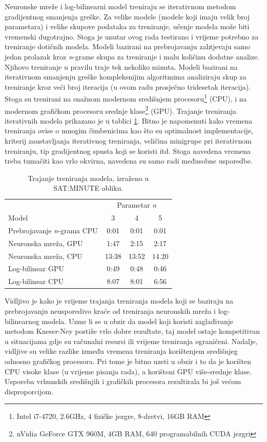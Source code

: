 \documentclass[times, utf8, diplomski, numeric]{fer}
\begin{document}
Neuronske mreže i log-bilinearni model treniraju se iterativnom metodom gradijentnog smanjenja greške. Za velike modele (modele koji imaju velik broj parametara) i velike skupove podataka za treniranje, učenje modela može biti vremenski dugotrajno. Stoga je unutar ovog rada testirano i vrijeme potrebno za treniranje dotičnih modela. Modeli bazirani na prebrojavanju zahtjevaju samo jedan prolazak kroz \textit{n}-grame skupa za treniranje i malu količinu dodatne analize. Njihovo treniranje u pravilu traje tek nekoliko minuta. Modeli bazirani na iterativnom smanjenju greške kompleksnijim algoritmima analiziraju skup za treniranje kroz veći broj iteracija (u ovom radu prosječno tridesetak iteracija). Stoga su trenirani na snažnom modernom središnjem procesoru\footnote{Intel i7-4720, 2.6GHz, 4 fizičke jezgre, 8-dretvi, 16GB RAM} (CPU), i na modernom grafičkom procesoru srednje klase\footnote{nVidia GeForce GTX 960M, 4GB RAM, 640 programabilnih CUDA jezgri} (GPU). Trajanje treniranja iterativnih modela prikazano je u tablici \ref{tbl:eval_time}. Bitno je napomenuti kako vremena treniranja ovise o mnogim čimbenicima kao što su optimalnost implementacije, kriterij zaustavljanja iterativnog treniranja, veličina minigrupe pri iterativnom treniranju, tip gradijentnog spusta koji se koristi itd. Stoga navedena vremena treba tumačiti kao vrlo okvirna, navedena su samo radi međusobne usporedbe.

\begin{table}[htb]
\caption{Trajanje treniranja modela, izraženo u SAT:MINUTE obliku.}
\label{tbl:eval_time}
\centering
\begin{tabular}{lccc}
\toprule
 & \multicolumn{3}{c}{Parametar \textit{n}} \\
\cmidrule(r){2-4}
Model & 3 & 4 & 5 \\
\midrule
Prebrojavanje \textit{n}-grama CPU &  0:01 & 0:01 & 0.01 \\
Neuronska mreža, GPU & 1:47 & 2:15 & 2:17 \\
Neuronska mreža, CPU & 13:38 & 13:52 & 14.20 \\
Log-bilinear GPU & 0:49 & 0:48 & 0:46 \\
Log-bilinear CPU & 8:07 & 8:01 & 6:56 \\
\bottomrule
\end{tabular}
\end{table}


Vidljivo je kako je vrijeme trajanja treniranja modela koji se baziraju na prebrojavanju neusporedivo kraće od treniranja neuronskih mreža i log-bilinearnog modela. Uzme li se u obzir da model koji koristi zaglađivanje metodom Kneser-Ney postiže vrlo dobre rezultate, taj model ostaje kompetitivan u situacijama gdje su računalni resursi ili vrijeme treniranja ograničeni. Nadalje, vidljive su velike razlike između vremena treniranja korištenjem središnjeg odnosno grafičkog procesora. Pri tome je bitno uzeti u obzir i to da je korišten CPU visoke klase (u vrijeme pisanja rada), a korišteni GPU više-srednje klase. Usporeba vrhunskih središnjih i grafičkih procesora rezultirala bi još većom disproporcijom.
\end{document}
